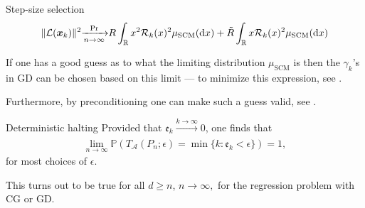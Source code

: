 \documentclass[9pt,aspectratio=169]{beamer}
\newcommand{\To}[1]{
  { \xrightarrow[ ]{#1 \to \infty }}
}
\begin{document}
\begin{frame}{Step-size selection}
    \begin{align*}
        \| \mathcal L({\boldsymbol x}_k) \|^2 { \xrightarrow[ n \to \infty]{\Pr }} R \int_{\mathbb R}x^2 \mathcal R_k(x)^2 \mu_{\mathrm{SCM}}(\mathop{}\!\mathrm{d} x) + \tilde R \int_{\mathbb R} x \mathcal R_k(x)^2 \mu_{\mathrm{SCM}}(\mathop{}\!\mathrm{d} x)
    \end{align*}
    
    If one has a good guess as to what the limiting distribution $\mu_{\mathrm{SCM}}$ is then the $\gamma_k$'s in GD can be chosen based on this limit --- to minimize this expression, see \cite{pedregosa2020acceleration}.
    
    \pause
    
    Furthermore, by preconditioning one can make such a guess valid, see \cite{lacotte2020optimal}.
\end{frame}

\begin{frame}{Deterministic halting}
Provided that $\mathfrak e_k \To{k} 0$, one finds that
\begin{align*}
    \lim_{n \to \infty} \mathbb P \left( T_{\mathcal A}(P_n;\epsilon) = \min \{ k : \mathfrak e_k < \epsilon \} \right) = 1,
\end{align*}
for most choices of $\epsilon$.\\
\vspace{.1in}

This turns out to be true for all $d \geq n$, $n \to \infty,$ for the regression problem with CG or GD.
\end{frame}
\end{document}

